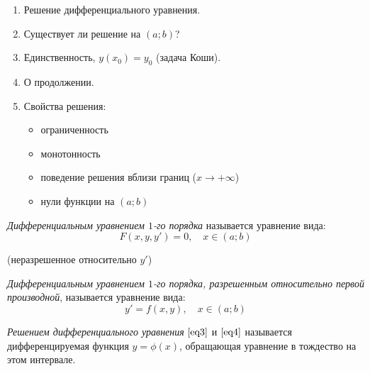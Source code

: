 \begin{note}\leavevmode
    \begin{enumerate}
        \item Решение дифференциального уравнения.
        \item Существует ли решение на $(a;b)$?
        \item Единственность, $y(x_0)=y_0$ (задача Коши).
        \item О продолжении.
        \item Свойства решения: \begin{itemize}
                  \item ограниченность
                  \item монотонность
                  \item поведение решения вблизи границ ($x \rightarrow +\infty$)
                  \item нули функции на $(a;b)$
              \end{itemize}
    \end{enumerate}
\end{note}

\begin{definition}
    \emph{Дифференциальным уравнением $1$-го порядка} называется уравнение вида:
    \begin{equation}\label{eq3}
        F(x,y,y')=0, \quad x \in (a;b)
    \end{equation}
    \begin{center}
        (неразрешенное относительно $y'$)
    \end{center}
\end{definition}

\begin{definition}
    \emph{Дифференциальным уравнением $1$-го порядка, разрешенным относительно первой производной}, называется уравнение вида:
    \begin{equation}\label{eq4}
        y'=f(x,y), \quad x \in (a;b)
    \end{equation}
\end{definition}

\begin{definition}
    \emph{Решением дифференциального уравнения} $\ref{eq3}$ и $\ref{eq4}$ называется дифференцируемая функция $y = \phi(x)$, обращающая уравнение в тождество на этом интервале.
\end{definition}


